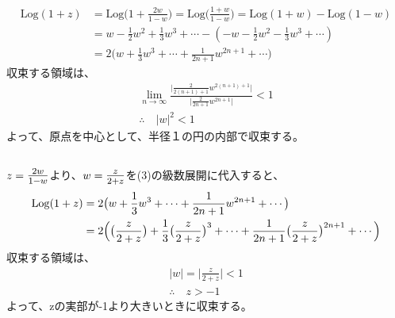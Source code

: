 \documentclass[dvipdfmx,a4paper]{jsarticle}
\begin{document}
\subsection{}
\begin{align*}
\mathrm{Log}(1+z) &= \mathrm{Log}\bigl(1+\frac{2w}{1-w}\bigr) = \mathrm{Log}\bigl(\frac{1+w}{1-w}\bigr) = \mathrm{Log}(1+w) - \mathrm{Log}(1-w)\\
&= w - \frac{1}{2}w^2 + \frac{1}{3}w^3 + \cdots - (-w - \frac{1}{2}w^2 -\frac{1}{3}w^3 + \cdots)\\
&= 2\bigl(w + \frac{1}{3}w^3 + \cdots + \frac{1}{2n+1}w^{2n+1} + \cdots \bigr)
\end{align*}
収束する領域は、
\begin{align*}
\lim_{n \to \infty} \frac{\bigl|\frac{2}{2(n+1)+1}w^{2(n+1)+1}\bigr|}{\bigl|\frac{2}{2n+1}w^{2n+1}\bigr|} < 1\\
\therefore \quad |w|^2 < 1
\end{align*}
よって、原点を中心として、半径１の円の内部で収束する。\\

\subsection{}
$z = \mbox{\large$\frac{2w}{1-w}$}$より、$w = \mbox{\large$\frac{z}{2+z}$}$を(3)の級数展開に代入すると、
\begin{align*}
\mathrm{Log}(1+z) &= 2\bigl(w + \frac{1}{3}w^3 + \cdots + \frac{1}{2n+1}w^{2n+1} + \cdots \bigr)\\
&= 2\Bigl(\bigl(\frac{z}{2+z}\bigr) + \frac{1}{3}\bigl(\frac{z}{2+z}\bigr)^3 + \cdots + \frac{1}{2n+1}\bigl(\frac{z}{2+z}\bigr)^{2n+1} + \cdots \Bigr)
\end{align*}
収束する領域は、
\begin{align*}
|w| = \bigl|\frac{z}{2+z}\bigr| < 1\\
\therefore \quad z > -1
\end{align*}
よって、zの実部が-1より大きいときに収束する。
\end{document}
